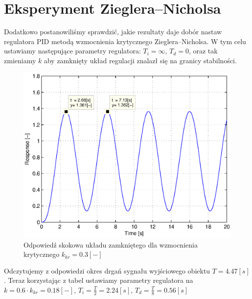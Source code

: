 \documentclass[12pt]{article}
\begin{document}
\section{Eksperyment Zieglera–Nicholsa}

Dodatkowo postanowiliśmy sprawdzić, jakie rezultaty daje dobór nastaw regulatora
PID metodą wzmocnienia krytycznego Zieglera–Nicholsa. W tym celu ustawiamy
następujące parametry regulatora: $T_i=\infty$, $T_d=0$, oraz tak zmieniamy $k$
aby zamknięty układ regulacji znalazł się na granicy stabilności.

\begin{figure}[!htb]
	\begin{center}
		\includegraphics[width=15cm]{../res/img/0,3-inf-0_resp_kryt.eps} 
	\end{center}
	\caption{Odpowiedź skokowa układu zamkniętego dla wzmocnienia krytycznego
	$k_{kr}=0.3[-]$}
\end{figure}

Odczytujemy z odpowiedzi okres drgań sygnału wyjściowego obiektu $T=4.47[s]$.
Teraz korzystając z tabel ustawiamy parametry regulatora na
$k=0.6\cdot k_{kr}=0.18[-]$, $T_i=\frac{T}{2}=2.24[s]$,
$T_d=\frac{T}{8}=0.56[s]$

\newpage
\end{document}
